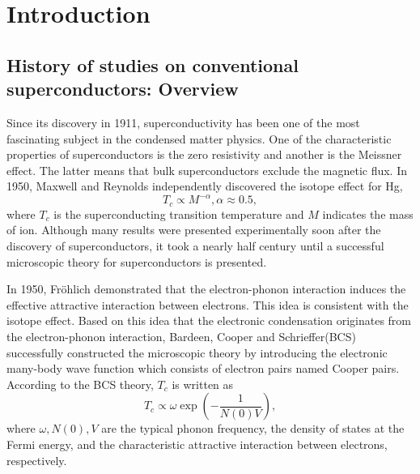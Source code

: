 

%
%
\chapter{Introduction}
\label{intro}



\section{History of studies on conventional superconductors: Overview}
Since its discovery in 1911\cite{Onnes1911}, superconductivity has been one of the most fascinating
subject in the condensed matter physics. One of the characteristic properties of superconductors is
the zero resistivity and another is the Meissner effect\cite{Meissner1933}.
The latter means that bulk superconductors exclude the magnetic flux.
In 1950, Maxwell\cite{Maxwell1950} and Reynolds\cite{Reynolds1950} independently discovered the 
isotope effect for Hg,
%
\begin{equation}
	T_{c} \propto M^{-\alpha}, \alpha \approx 0.5,
	\label{eq:isotope}
\end{equation}
%
where $T_c$ is the superconducting transition temperature and $M$ indicates the mass of ion.
Although many results were presented experimentally soon after the discovery of superconductors,
it took a nearly half century until a successful microscopic theory for superconductors is presented.

In 1950, Fr\"{o}hlich\cite{Froehlich1950} demonstrated that the electron-phonon interaction induces the
effective attractive interaction between electrons. This idea is consistent with the isotope effect.
Based on this idea that the electronic condensation originates from the electron-phonon interaction, 
Bardeen, Cooper and Schrieffer(BCS)\cite{BCS1957} successfully constructed the microscopic 
theory by introducing the electronic many-body wave function which consists of electron pairs named 
Cooper pairs\cite{Cooper1956}. According to the BCS theory, $T_c$ is written as
%
\begin{equation}
	T_{c} \propto \omega\exp \left( -\frac{1}{N(0)V} \right),
	\label{eq:TcBCS}
\end{equation}
%
where $\omega, N(0), V$ are the typical phonon frequency, the density of states at the Fermi energy, 
and the characteristic attractive interaction between electrons, respectively.

